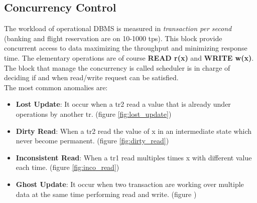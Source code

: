 \documentclass[12pt]{article}
\begin{document}
\subsection{Concurrency Control}
The workload of operational DBMS is measured in \textit{transaction per second} (banking and flight reservation are on 10-1000 tps). This block provide concurrent access to data maximizing the throughput and minimizing response time. The elementary operations are of course \textbf{READ r(x)} and \textbf{WRITE w(x)}. The block that manage the concurrency is called scheduler is in charge of deciding if and when read/write request can be satisfied.\\
The most common anomalies are:
\begin{itemize}
  \item \textbf{Lost Update}: It occur when a tr2 read a value that is already under operations by another tr. (figure \ref{fig:lost_update})
  \item \textbf{Dirty Read}: When a tr2 read the value of x in an intermediate state which never become permanent. (figure \ref{fig:dirty_read})
  \item \textbf{Inconsistent Read}: When a tr1 read multiples times x with different value each time. (figure \ref{fig:inco_read})
  \item \textbf{Ghost Update}: It occur when two transaction are working over multiple data at the same time performing read and write. (figure )
\end{itemize}
\end{document}
